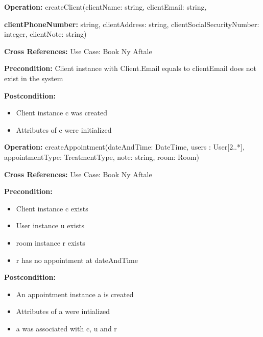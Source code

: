 %
%
%
 
\noindent

\textbf{Operation:} createClient(clientName: string, clientEmail: string, 

\textbf{clientPhoneNumber:} string, clientAddress: string, clientSocialSecurityNumber: integer, clientNote: string) 

\textbf{Cross References:} Use Case: Book Ny Aftale 

\textbf{Precondition:} Client instance with Client.Email equals to clientEmail does not exist in the system 

\textbf{Postcondition:}  
		\begin{itemize}
			\item Client instance c was created 
			\item Attributes of c were initialized
		\end{itemize}
  
\textbf{Operation:} createAppointment(dateAndTime: DateTime, users : User[2..*], appointmentType: TreatmentType, note: string, room: Room) 

\textbf{Cross References:} Use Case: Book Ny Aftale 

\textbf{Precondition: }
		\begin{itemize}
			\item Client instance c exists 
			\item User instance u exists 
			\item room instance r exists 
			\item r has no appointment at dateAndTime
		\end{itemize}
		
\textbf{Postcondition:}  
        \begin{itemize}
            \item An appointment instance a is created
            \item Attributes of a were intialized
            \item a was associated with c, u and r
        \end{itemize}